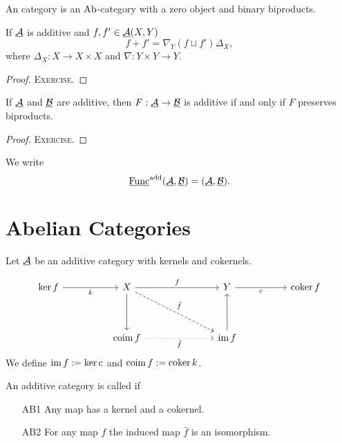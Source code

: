 \begin{definition*}
	An  category is an \( \mathrm{Ab} \)-category with a zero object and binary biproducts.
\end{definition*}

\begin{proposition*}
	If \( \underline{\mathcal A} \) is additive and \( f, f' \in \underline{\mathcal A}(X, Y) \)
	\[
		f+f' = \nabla_Y (f \sqcup f') \Delta_X,
	\]
	where \( \Delta_X: X \to X \times X \) and \( \nabla: Y \times Y \to Y \).
\end{proposition*}
\begin{proof}
	\textsc{Exercise}.
\end{proof}

\begin{proposition*}
	If \( \underline{\mathcal A} \) and \( \underline{\mathcal B} \) are additive, then \( F: \underline{\mathcal A} \to \underline{\mathcal B} \) is additive if and only if \( F \) preserves biproducts.
\end{proposition*}
\begin{proof}
	\textsc{Exercise}.
\end{proof}

We write
\[
	\operatorname{\underline{\mathrm{Func}}}^{\text{add}}(\underline{\mathcal A}, \underline{\mathcal B}) = (\underline{\mathcal A}, \underline{\mathcal B}).
\]

\section{Abelian Categories}

Let \( \underline{\mathcal A} \) be an additive category with kernels and cokernels.

\[
	\begin{tikzcd}{\ker f} && X &&& Y && {\coker f} \\
		\\
		&& {\coim f} &&& {\im f}
		\arrow["k"', from=1-1, to=1-3]
		\arrow["f", from=1-3, to=1-6]
		\arrow[from=1-3, to=3-3]
		\arrow["{\tilde{f}}", dashed, from=1-3, to=3-6]
		\arrow["c"', from=1-6, to=1-8]
		\arrow["{\bar{f}}"', dotted, from=3-3, to=3-6]
		\arrow[from=3-6, to=1-6]
	\end{tikzcd}
\]
We define \( \operatorname{im} f := \ker c \) and \( \operatorname{coim} f := \operatorname{coker} k \).

\begin{definition*}
	An additive category is called  if
	\begin{enumerate}
		\item[AB1] Any map has a kernel and a cokernel.
		\item[AB2] For any map \( f \) the induced map \( \bar{f} \) is an isomorphism.
	\end{enumerate}
\end{definition*}

